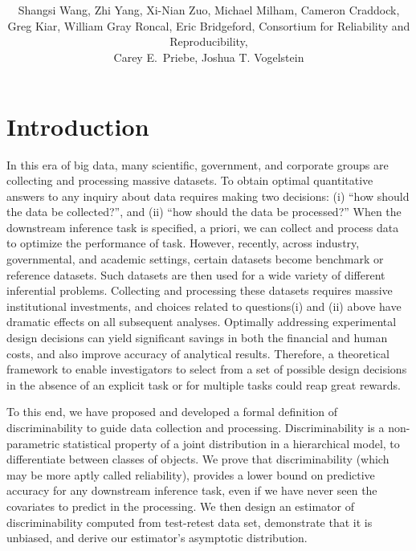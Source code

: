 \documentclass{article}
\title{\vspace{-50pt}
\db{Optimal Design for Discovery Science via Maximizing Discriminability: \\ Applications in Neuroimaging}
}
\author{Shangsi Wang, Zhi Yang, Xi-Nian Zuo, Michael Milham, Cameron Craddock,  \\ 
Greg Kiar, William Gray Roncal, Eric Bridgeford,
Consortium for Reliability and Reproducibility, \\ Carey E.~Priebe, Joshua T. Vogelstein}
\begin{document}
\maketitle
\tableofcontents
\newpage

\section{Introduction}

 In this era of big data, many scientific, government, and corporate groups are collecting and processing massive datasets. To obtain optimal quantitative answers to any inquiry about data requires making two decisions: (i) “how should the data be collected?”, and (ii) “how should the data be processed?”  When the downstream inference task is specified, a priori, we can collect and process data to optimize the performance of task. However, recently, across industry, governmental, and academic settings, certain datasets become benchmark or reference datasets. Such datasets are then used for a wide variety of different inferential problems. Collecting and processing these datasets requires massive institutional investments, and choices related to questions(i) and (ii) above have dramatic effects on all subsequent analyses. Optimally addressing experimental design decisions can yield significant savings in both the financial and human costs, and also improve accuracy of analytical results. Therefore, a theoretical framework to enable investigators to select from a set of possible design decisions in the absence of an explicit task or for multiple tasks could reap great rewards.



To this end, we have proposed and developed a formal definition of discriminability to guide data collection and processing. Discriminability is a non-parametric statistical property of a joint distribution in a hierarchical model, to differentiate between classes of objects. We prove that discriminability (which may be more aptly called reliability), provides a lower bound on predictive accuracy for any downstream inference task, even if we have never seen the covariates to predict in the processing. We then design an estimator of discriminability computed from test-retest data set, demonstrate that it is unbiased, and derive our estimator’s asymptotic distribution. 
\end{document}
